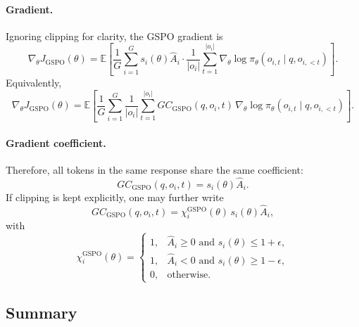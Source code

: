 \documentclass{article}
\begin{document}
\paragraph{Gradient.}
Ignoring clipping for clarity, the GSPO gradient is
\begin{equation}
\nabla_\theta J_{\mathrm{GSPO}}(\theta)
=
\mathbb{E}
\left[
\frac{1}{G}
\sum_{i=1}^G
s_i(\theta)\hat A_i
\cdot
\frac{1}{|o_i|}
\sum_{t=1}^{|o_i|}
\nabla_\theta \log \pi_\theta(o_{i,t}\mid q,o_{i,<t})
\right].
\label{eq:gspo_gradient}
\end{equation}
Equivalently,
\begin{equation}
\nabla_\theta J_{\mathrm{GSPO}}(\theta)
=
\mathbb{E}
\left[
\frac{1}{G}
\sum_{i=1}^G
\frac{1}{|o_i|}
\sum_{t=1}^{|o_i|}
GC_{\mathrm{GSPO}}(q,o_i,t)\,
\nabla_\theta \log \pi_\theta(o_{i,t}\mid q,o_{i,<t})
\right].
\label{eq:gspo_gradient_unified}
\end{equation}

\paragraph{Gradient coefficient.}
Therefore, all tokens in the same response share the same coefficient:
\begin{equation}
GC_{\mathrm{GSPO}}(q,o_i,t)=s_i(\theta)\hat A_i.
\label{eq:gspo_gc}
\end{equation}
If clipping is kept explicitly, one may further write
\begin{equation}
GC_{\mathrm{GSPO}}(q,o_i,t)
=
\chi^{\mathrm{GSPO}}_i(\theta)\,s_i(\theta)\hat A_i,
\label{eq:gspo_gc_clipped}
\end{equation}
with
\begin{equation}
\chi^{\mathrm{GSPO}}_i(\theta)
=
\begin{cases}
1, & \hat A_i \ge 0 \text{ and } s_i(\theta)\le 1+\epsilon,\\
1, & \hat A_i < 0 \text{ and } s_i(\theta)\ge 1-\epsilon,\\
0, & \text{otherwise}.
\end{cases}
\label{eq:gspo_indicator}
\end{equation}

\subsection{Summary}
\end{document}
